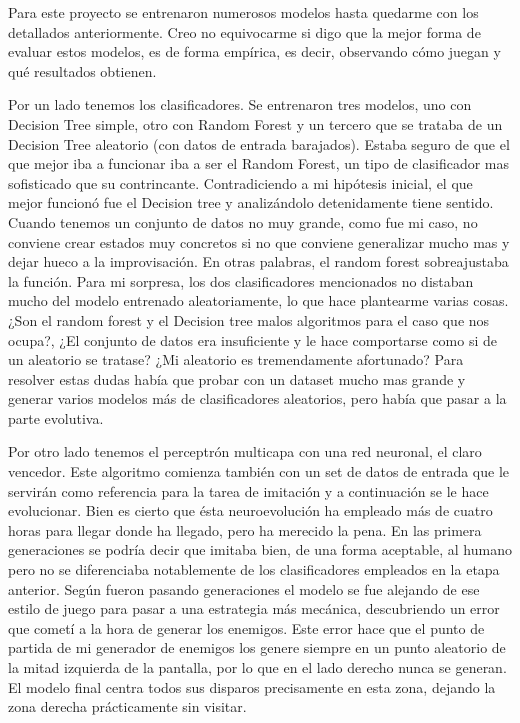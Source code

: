 
Para este proyecto se entrenaron numerosos modelos hasta quedarme con los detallados anteriormente. Creo no equivocarme si digo que la mejor forma de evaluar estos modelos, es de forma empírica, es decir, observando cómo juegan y qué resultados obtienen.

Por un lado tenemos los clasificadores. Se entrenaron tres modelos, uno con Decision Tree simple, otro con Random Forest y un tercero que se trataba de un Decision Tree aleatorio (con datos de entrada barajados). Estaba seguro de que el que mejor iba a funcionar iba a ser el Random Forest, un tipo de clasificador mas sofisticado que su contrincante. Contradiciendo a mi hipótesis inicial, el que mejor funcionó fue el Decision tree y analizándolo detenidamente tiene sentido. Cuando tenemos un conjunto de datos no muy grande, como fue mi caso, no conviene crear estados muy concretos si no que conviene generalizar mucho mas y dejar hueco a la improvisación. En otras palabras, el random forest sobreajustaba la función. Para mi sorpresa, los dos clasificadores mencionados no distaban mucho del modelo entrenado aleatoriamente, lo que hace plantearme varias cosas. ¿Son el random forest y el Decision tree malos algoritmos para el caso que nos ocupa?, ¿El conjunto de datos era insuficiente y le hace comportarse como si de un aleatorio se tratase? ¿Mi aleatorio es tremendamente afortunado? Para resolver estas dudas había que probar con un dataset mucho mas grande y generar varios modelos más de clasificadores aleatorios, pero había que pasar a la parte evolutiva.


Por otro lado tenemos el perceptrón multicapa con una red neuronal, el claro vencedor. Este algoritmo comienza también con un set de datos de entrada que le servirán como referencia para la tarea de imitación y a continuación se le hace evolucionar. Bien es cierto que ésta neuroevolución ha empleado más de cuatro horas para llegar donde ha llegado, pero ha merecido la pena. En las primera generaciones se podría decir que imitaba bien, de una forma aceptable, al humano pero no se diferenciaba notablemente de los clasificadores empleados en la etapa anterior. Según fueron pasando generaciones el modelo se fue alejando de ese estilo de juego para pasar a una estrategia más mecánica, descubriendo un error que cometí a la hora de generar los enemigos. Este error hace que el punto de partida de mi generador de enemigos los genere siempre en un punto aleatorio de la mitad izquierda de la pantalla, por lo que en el lado derecho nunca se generan. El modelo final centra todos sus disparos precisamente en esta zona, dejando la zona derecha prácticamente sin visitar. 

